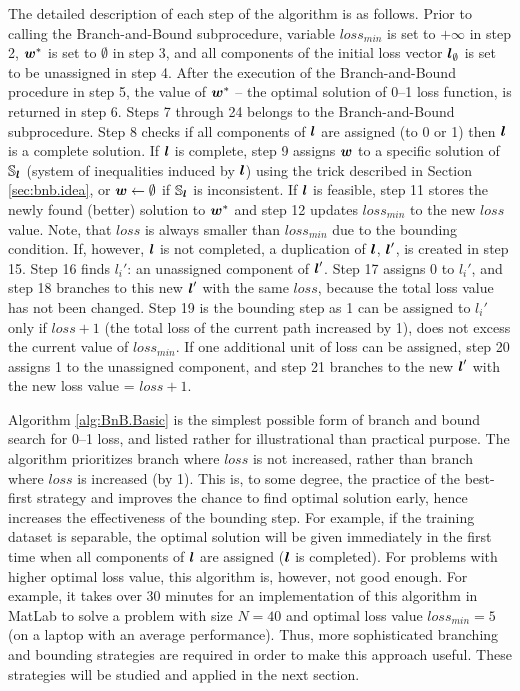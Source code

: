 The detailed description of each step of the algorithm is as follows. Prior to calling the {\sc Branch-and-Bound} subprocedure, variable $loss_{min}$ is set to $+\infty$ in step 2, $\boldsymbol{w}^*$ is set to $\emptyset$ in step 3, and all components of the initial loss vector $\boldsymbol{l}_\emptyset$ is set to be unassigned in step 4. After the execution of the {\sc Branch-and-Bound} procedure in step 5, the value of $\boldsymbol{w}^*$ -- the optimal solution of 0--1 loss function, is returned in step 6. Steps 7 through 24 belongs to the {\sc Branch-and-Bound} subprocedure. Step 8 checks if all components of $\boldsymbol{l}$ are assigned (to 0 or 1) then $\boldsymbol{l}$ is a complete solution. If $\boldsymbol{l}$ is complete, step 9 assigns $\boldsymbol{w}$ to a specific solution of $\mathbb{S}_{\boldsymbol{l}}$ (system of inequalities induced by $\boldsymbol{l}$) using the trick described in Section \ref{sec:bnb.idea}, or $\boldsymbol{w} \gets \emptyset$ if $\mathbb{S}_{\boldsymbol{l}}$ is inconsistent. If $\boldsymbol{l}$ is feasible, step 11 stores the newly found (better) solution to $\boldsymbol{w}^*$ and step 12 updates $loss_{min}$ to the new $loss$ value. Note, that $loss$ is always smaller than $loss_{min}$ due to the bounding condition. If, however, $\boldsymbol{l}$ is not completed, a duplication of $\boldsymbol{l}$, $\boldsymbol{l}'$, is created in step 15. Step 16 finds $l_i'$: an unassigned component of $\boldsymbol{l}'$. Step 17 assigns 0 to $l_i'$, and step 18 branches to this new $\boldsymbol{l}'$ with the same $loss$, because the total loss value has not been changed. Step 19 is the bounding step as 1 can be assigned to $l_i'$ only if $loss+1$ (the total loss of the current path increased by 1), does not excess the current value of $loss_{min}$. If one additional unit of loss can be assigned, step 20 assigns 1 to the unassigned component, and step 21 branches to the new $\boldsymbol{l}'$ with the new loss value =  $loss+1$.  


Algorithm \ref{alg:BnB.Basic} is the simplest possible form of branch and bound search for 0--1 loss, and listed rather for illustrational than practical purpose. The algorithm prioritizes branch where $loss$ is not increased, rather than branch where $loss$ is increased (by 1). This is, to some degree, the practice of the best-first strategy and improves the chance to find optimal solution early, hence increases the effectiveness of the bounding step. For example, if the training dataset is separable, the optimal solution will be given immediately in the first time when all components of $\boldsymbol{l}$ are assigned ($\boldsymbol{l}$ is completed). For problems with higher optimal loss value, this algorithm is, however, not good enough. For example, it takes over 30 minutes for an implementation of this algorithm in MatLab to solve a problem with size $N=40$ and optimal loss value $loss_{min}=5$ (on a laptop with an average performance). Thus, more sophisticated branching and bounding strategies are required in order to make this approach useful. These strategies will be studied and applied in the next  section.  



